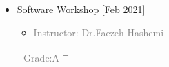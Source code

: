 \documentclass[10pt,a4paper,sans]{moderncv} %
\begin{document}
\begin{multicols}{2}
\begin{itemize}
\begin{itemize}
\begin{itemize}
                 \end{itemize}   
                 
			    \end{itemize}
			    
			\item {} Software Workshop \hfill[Feb 2021]
               \begin{itemize}
                \item\textcolor{gray}{Instructor: 
                {Dr.Faezeh Hashemi}}
                \end{itemize}
                
                \begin{itemize}
                \textcolor{gray}{- Grade:A }\textsuperscript{+}
                \end{itemize}

			
			\vspace{0.1 em} 

				
			
			\vspace{0.3 em} 
			
			\end{itemize}
		
	\end{multicols}
	
	\vspace{5.6 em}
	
\end{document}
